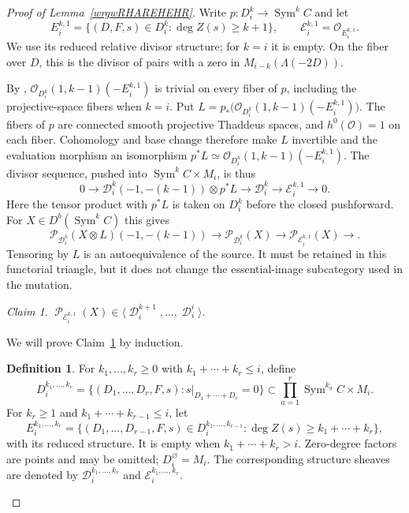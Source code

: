 \documentclass[11pt,letterpaper]{amsart}
\theoremstyle{plain}
\theoremstyle{definition}
\newtheorem{definition}[theorem]{Definition}
\theoremstyle{remark}
\newtheorem{claim}[theorem]{Claim}
\numberwithin{equation}{section}
\DeclareMathOperator{\Sym}{Sym}
\DeclareMathOperator{\cD}{\mathcal{D}}
\DeclareMathOperator{\cE}{\mathcal{E}}
\DeclareMathOperator{\cP}{\mathcal{P}}
\begin{document}
\begin{proof}[Proof of Lemma~\ref{wrgwRHAREHEHR}]
Write $p:D_i^k\to\Sym^kC$ and let
\[
 E_i^{k,1}=\{(D,F,s)\in D_i^k:\deg Z(s)\ge k+1\},
 \qquad \mathcal E_i^{k,1}=\mathcal O_{E_i^{k,1}}.
\]
We use its reduced relative divisor structure; for $k=i$ it is empty.
On the fiber over $D$, this is the divisor of pairs with a zero in
$M_{i-k}(\Lambda(-2D))$.  

By \cite[Remark~3.7 and Definition~6.4]{TT},
$
 \mathcal O_{D_i^k}(1,k-1)(-E_i^{k,1})
$
is trivial on every fiber of $p$, including the projective-space fibers
when $k=i$.  Put
$
 L=p_*\bigl(\mathcal O_{D_i^k}(1,k-1)(-E_i^{k,1})\bigr).
$
The fibers of $p$ are connected smooth projective Thaddeus spaces, and
$h^0(\mathcal O)=1$ on each fiber.  Cohomology and base change therefore
make $L$ invertible and the evaluation morphism an isomorphism
$
 p^*L\simeq\mathcal O_{D_i^k}(1,k-1)(-E_i^{k,1})
$.
The divisor sequence, pushed into $\Sym^kC\times M_i$, is thus
\[
 0\longrightarrow
 \mathcal D_i^k(-1,-(k-1))\otimes p^*L
 \longrightarrow\mathcal D_i^k
 \longrightarrow\mathcal E_i^{k,1}\longrightarrow0.
\]
Here the tensor product with $p^*L$ is taken on $D_i^k$ before the
closed pushforward.  For $X\in D^b(\Sym^kC)$ this gives
\begin{equation}\label{afbasfbab}
 \mathcal P_{\mathcal D_i^k}(X\otimes L)(-1,-(k-1))
 \longrightarrow\mathcal P_{\mathcal D_i^k}(X)
 \longrightarrow\mathcal P_{\mathcal E_i^{k,1}}(X)
 \longrightarrow .
\end{equation}
Tensoring by $L$ is an autoequivalence of the source.  It must be
retained in this functorial triangle, but it does not change the
essential-image subcategory used in the mutation.

\begin{claim}\label{qdfberb}
$\cP_{\cE_i^{k,1}}(X)\in\langle\cD_i^{k+1},\ldots,\cD_i^i\rangle$.
\end{claim}

We will prove Claim~\ref{qdfberb} by induction. 

\begin{definition}\label{SGsrhsrha}
For $k_1,\ldots,k_r\ge0$ with $k_1+\cdots+k_r\le i$, define
\[
 D_i^{k_1,\ldots,k_r}=
 \{(D_1,\ldots,D_r,F,s):s|_{D_1+\cdots+D_r}=0\}
 \subset\prod_{a=1}^r\Sym^{k_a}C\times M_i.
\]
For $k_r\ge1$ and $k_1+\cdots+k_{r-1}\le i$, let
\[
 E_i^{k_1,\ldots,k_r}=
 \{(D_1,\ldots,D_{r-1},F,s)\in D_i^{k_1,\ldots,k_{r-1}}:
        \deg Z(s)\ge k_1+\cdots+k_r\},
\]
with its reduced structure.  It is empty when
$k_1+\cdots+k_r>i$.  Zero-degree factors are points and may be omitted;
$D_i^{\varnothing}=M_i$.  The corresponding structure sheaves are
denoted by $\mathcal D_i^{k_1,\ldots,k_r}$ and
$\mathcal E_i^{k_1,\ldots,k_r}$.
\end{definition}


\end{proof}
\end{document}
